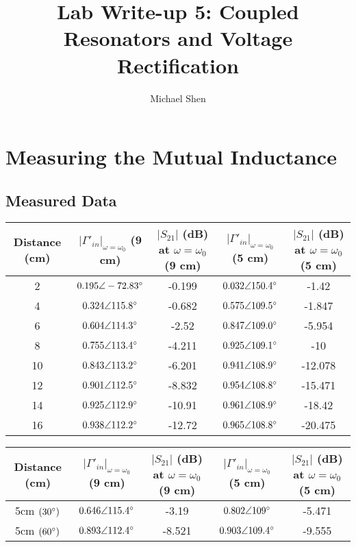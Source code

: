 \documentclass{article}
\begin{document}
\title{Lab Write-up 5: Coupled Resonators and Voltage Rectification}
\author{Michael Shen}
\maketitle


\section{Measuring the Mutual Inductance}

\subsection{Measured Data}
\begin{table}[H]
\centering
\begin{tabular}{|c|c|c|c|c|}
\hline
Distance (cm)& $\vert\Gamma '_{in}\vert_{\omega=\omega_0}$ (9 cm)     
			 & $\vert S_{21}\vert$ (dB) at $\omega = \omega_0$ (9 cm)
			 & $\vert\Gamma '_{in}\vert_{\omega=\omega_0}$ (5 cm)     
			 & $\vert S_{21}\vert$ (dB) at $\omega = \omega_0$ (5 cm) \\ \hline
2   		 & $0.195\angle-72.83\degree$ & -0.199 & $0.032\angle150.4\degree$  & -1.42   \\ \hline
4   	 	 & $0.324\angle115.8\degree$  & -0.682 & $0.575\angle109.5\degree$  & -1.847  \\ \hline
6   	 	 & $0.604\angle114.3\degree$  & -2.52  & $0.847\angle109.0\degree$  & -5.954  \\ \hline
8		     & $0.755\angle113.4\degree$  & -4.211 & $0.925\angle109.1\degree$  & -10     \\ \hline
10  		 & $0.843\angle113.2\degree$  & -6.201 & $0.941\angle108.9\degree$  & -12.078 \\ \hline
12 			 & $0.901\angle112.5\degree$  & -8.832 & $0.954\angle108.8\degree$  & -15.471 \\ \hline
14 			 & $0.925\angle112.9\degree$  & -10.91 & $0.961\angle108.9\degree$  & -18.42  \\ \hline
16  		 & $0.938\angle112.2\degree$  & -12.72 & $0.965\angle108.8\degree$  & -20.475 \\ \hline
\end{tabular}
\end{table}

\begin{table}[h]
\centering
\begin{tabular}{|c|c|c|c|c|}
\hline
Distance (cm)	  & $\vert\Gamma '_{in}\vert_{\omega=\omega_0}$ (9 cm)     
			 	  & $\vert S_{21}\vert$ (dB) at $\omega = \omega_0$ (9 cm)
			 	  & $\vert\Gamma '_{in}\vert_{\omega=\omega_0}$ (5 cm)     
			      & $\vert S_{21}\vert$ (dB) at $\omega = \omega_0$ (5 cm) \\ \hline
5cm $(30\degree)$ & $0.646\angle115.4\degree$ & -3.19  & $0.802\angle109\degree$   & -5.471 \\ \hline
5cm $(60\degree)$ & $0.893\angle112.4\degree$ & -8.521 & $0.903\angle109.4\degree$ & -9.555 \\ \hline
\end{tabular}
\end{table}
\end{document}

